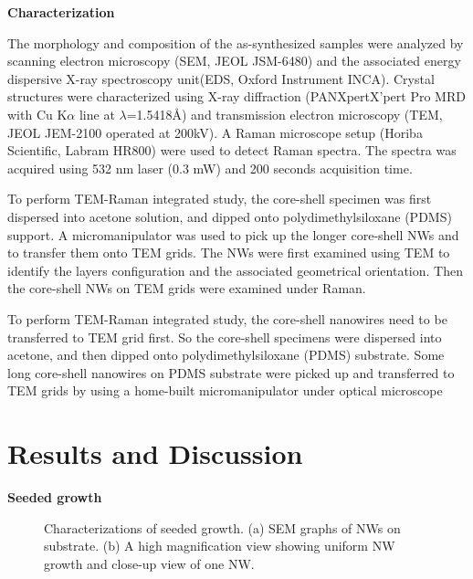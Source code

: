 \documentclass[11pt]{article} %
\begin{document}
\textbf{Characterization}

The morphology and composition of the as-synthesized samples were analyzed by scanning electron microscopy (SEM, JEOL JSM-6480) and the associated energy dispersive X-ray spectroscopy unit(EDS, Oxford Instrument INCA). Crystal structures were characterized using X-ray diffraction (PANXpertX’pert Pro MRD with Cu K$\alpha$ line at $\lambda$=1.5418\AA) and transmission electron microscopy (TEM, JEOL JEM-2100  operated at 200kV). A Raman microscope setup (Horiba Scientific, Labram HR800) were used to detect Raman spectra. The spectra was acquired using 532 nm laser (0.3 mW) and 200 seconds acquisition time.

To perform TEM-Raman integrated study, the core-shell specimen was first dispersed into acetone solution, and dipped onto polydimethylsiloxane (PDMS) support. A micromanipulator was used to pick up the longer core-shell NWs and to transfer them onto TEM grids. The NWs were first examined using TEM to identify the  layers configuration and the associated geometrical orientation. Then the core-shell NWs on TEM grids were examined under Raman.

To perform TEM-Raman integrated study, the core-shell nanowires need to be transferred to TEM grid first. So the core-shell specimens were dispersed into acetone, and then dipped onto polydimethylsiloxane (PDMS) substrate. Some long core-shell nanowires on PDMS substrate were picked up and transferred to TEM grids by using a home-built micromanipulator under optical microscope

\section{Results and Discussion}

\textbf{Seeded growth}

\begin{figure}[htb]
\centering
{}\hspace{0.04\textwidth}
\caption[Characterization of seeded growth : SEM]{Characterizations of seeded growth. (a) SEM graphs of  NWs on  substrate. (b) A high magnification view showing uniform NW growth and close-up view of one NW. }
\label{fig:woseedsem}
\end{figure}
\end{document}
